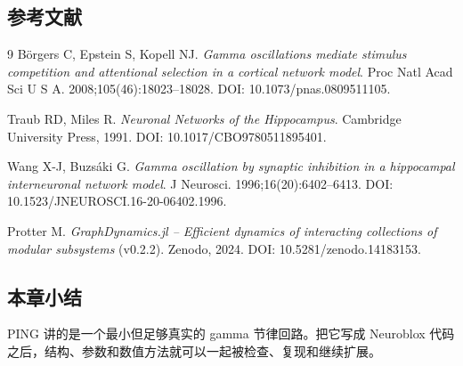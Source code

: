 \documentclass[a4paper]{article}
\begin{document}
\subsection{参考文献}
\begin{thebibliography}{9}
Börgers C, Epstein S, Kopell NJ. \emph{Gamma oscillations mediate stimulus competition and attentional selection in a cortical network model}. Proc Natl Acad Sci U S A. 2008;105(46):18023--18028. DOI: 10.1073/pnas.0809511105.

Traub RD, Miles R. \emph{Neuronal Networks of the Hippocampus}. Cambridge University Press, 1991. DOI: 10.1017/CBO9780511895401.

Wang X-J, Buzsáki G. \emph{Gamma oscillation by synaptic inhibition in a hippocampal interneuronal network model}. J Neurosci. 1996;16(20):6402--6413. DOI: 10.1523/JNEUROSCI.16-20-06402.1996.

Protter M. \emph{GraphDynamics.jl -- Efficient dynamics of interacting collections of modular subsystems} (v0.2.2). Zenodo, 2024. DOI: 10.5281/zenodo.14183153.
\end{thebibliography}

\subsection{本章小结}
PING 讲的是一个最小但足够真实的 gamma 节律回路。把它写成 Neuroblox 代码之后，结构、参数和数值方法就可以一起被检查、复现和继续扩展。
\end{document}
